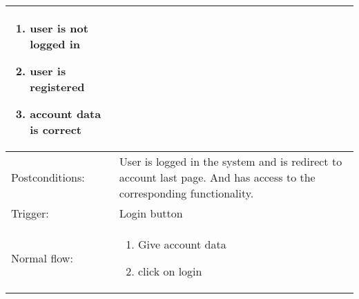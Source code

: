\begin{longtable}{| p{3.5cm} | p{9cm} |}
\begin{enumerate}
\item user is not logged in
\item user is registered
\item account data is correct
\end{enumerate}\\
\hline
Postconditions: & User is logged in the system and is redirect to account last page. And has access to the corresponding functionality.\\
\hline
Trigger: & Login button\\
\hline
Normal flow: &\mbox{}\par\vspace{-\baselineskip}
\begin{enumerate}
\item Give account data
\item click on login
\end{enumerate}\\
\hline
\end{longtable}





